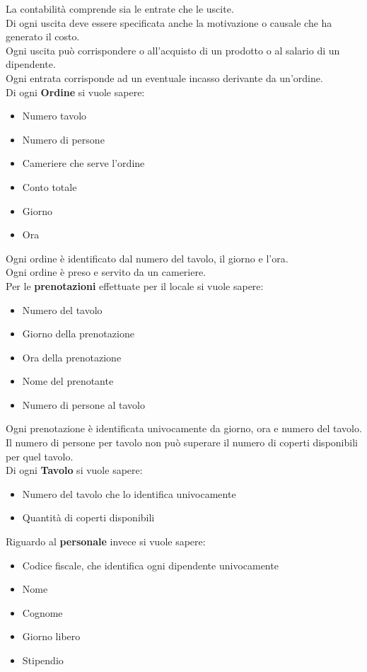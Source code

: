 La contabilità comprende sia le entrate che le uscite. \\
Di ogni uscita deve essere specificata anche la motivazione o causale che ha generato il costo. \\
Ogni uscita può corrispondere o all'acquisto di un prodotto o al salario di un dipendente. \\
Ogni entrata corrisponde ad un eventuale incasso derivante da un'ordine. \medskip \\
Di ogni \textbf{Ordine} si vuole sapere:
\begin{itemize}
    \item Numero tavolo 
    \item Numero di persone 
    \item Cameriere che serve l'ordine
    \item Conto totale
    \item Giorno
    \item Ora
\end{itemize}
Ogni ordine è identificato dal numero del tavolo, il giorno e l'ora. \\
Ogni ordine è preso e servito da un cameriere. \medskip \\
Per le \textbf{prenotazioni} effettuate per il locale si vuole sapere:
\begin{itemize}
    \item Numero del tavolo
    \item Giorno della prenotazione
    \item Ora della prenotazione
    \item Nome del prenotante
    \item Numero di persone al tavolo
\end{itemize}
Ogni prenotazione è identificata univocamente da giorno, ora e numero del tavolo. \\
Il numero di persone per tavolo non può superare il numero di coperti disponibili per quel tavolo. \medskip \\ 
Di ogni \textbf{Tavolo} si vuole sapere:
\begin{itemize}
    \item Numero del tavolo che lo identifica univocamente
    \item Quantità di coperti disponibili
\end{itemize}
Riguardo al \textbf{personale} invece si vuole sapere:
\begin{itemize}
    \item Codice fiscale, che identifica ogni dipendente univocamente
    \item Nome 
    \item Cognome 
    \item Giorno libero
    \item Stipendio
\end{itemize}
